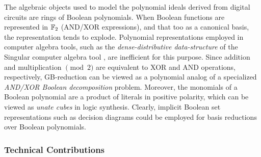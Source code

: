 The algebraic objects
used to model the polynomial ideals derived from digital circuits are
rings of Boolean polynomials.
When Boolean functions are represented in ${\mathbb{F}}_2$ (AND/XOR
expressions), and that too as a canonical \Grobner basis, the
representation tends to explode. 
Polynomial representations employed in computer
algebra tools, such as the {\it dense-distributive 
data-structure} of the {\sc Singular} computer algebra tool
\cite{DGPS}, are inefficient for this purpose. Since addition and
multiplication $\pmod{2}$ are equivalent to XOR and AND operations,
respectively, GB-reduction can be viewed as a polynomial analog of a
specialized {\it AND/XOR Boolean decomposition} problem. Moreover,
the monomials of a Boolean polynomial are a product of literals in
positive polarity, which can be viewed as {\it unate cubes} in logic
synthesis. Clearly, implicit Boolean set representations such as
decision diagrams could be employed for \Grobner basis reductions over
Boolean polynomials. 


\subsubsection{Technical Contributions} %


